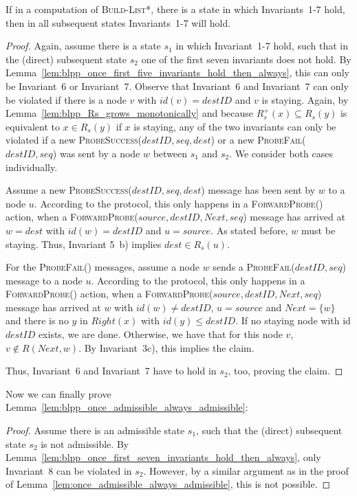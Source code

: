\documentclass[a4paper,USenglish]{lipics}
\newcommand{\blpp}{\textsc{Build-List*}\xspace}
\newcommand{\forwardprobe}[1]{\textsc{ForwardProbe(\ensuremath{#1})}\xspace}
\newcommand{\psuccess}[1]{\textsc{ProbeSuccess(\ensuremath{#1})}\xspace}
\newcommand{\pfail}[1]{\textsc{ProbeFail(\ensuremath{#1})}\xspace}
\newcommand{\rsp}{\ensuremath{R_s^+}\xspace}
\begin{document}
\begin{lemma}\label{lem:blpp_once_first_seven_invariants_hold_then_always}
 If in a computation of \blpp, there is a state in which Invariants~1-7 hold, then in all subsequent states Invariants~1-7 will hold.
\end{lemma}
\begin{proof}
  Again, assume there is a state $s_1$ in which Invariant~1-7 hold, such that in the (direct) subsequent state $s_2$ one of the first seven invariants does not hold.
 By Lemma~\ref{lem:blpp_once_first_five_invariants_hold_then_always}, this can only be Invariant~6 or Invariant~7.
 Observe that Invariant~6 and Invariant~7 can only be violated if there is a node $v$ with $id(v) = destID$ and $v$ is staying.
 Again, by Lemma~\ref{lem:blpp_Rs_grows_monotonically} and because $\rsp(x) \subseteq R_s(y)$ is equivalent to $x \in R_s(y)$ if $x$ is staying, any of the two invariants can only be violated if a new \psuccess{destID,seq,dest} or a new \pfail{destID,seq} was sent by a node $w$ between $s_1$ and $s_2$.
 We consider both cases individually.
 
 Assume a new \psuccess{destID,seq,dest} message has been sent by $w$ to a node $u$.
 	According to the protocol, this only happens in a \forwardprobe{} action, when a \forwardprobe{source,destID,Next,seq} message has arrived at $w = dest$ with $id(w) = destID$ and $u = source$.
 	As stated before, $w$ must be staying.
	Thus, Invariant 5~b) implies $dest \in R_s(u)$.
	
	For the \pfail{} messages, assume a node $w$ sends a \pfail{destID, seq} message to a node $u$.
	According to the protocol, this only happens in a \forwardprobe{} action, when a \forwardprobe{source,destID,Next,seq} message has arrived at $w$ with $id(w) \neq destID$, $u = source$ and $Next = \{w\}$ and there is no $y$ in $Right(x)$ with $id(y) \leq destID$.
	If no staying node with id $destID$ exists, we are done.
	Otherwise, we have that for this node $v$, $v \notin R(Next,w)$.
	By Invariant~3c), this implies the claim.

 Thus, Invariant~6 and Invariant~7 have to hold in $s_2$, too, proving the claim.
\end{proof}
Now we can finally prove Lemma~\ref{lem:blpp_once_admissible_always_admissible}:
\begin{proof}
 Assume there is an admissible state $s_1$, such that the (direct) subsequent state $s_2$ is not admissible.
 By Lemma~\ref{lem:blpp_once_first_seven_invariants_hold_then_always}, only Invariant~8 can be violated in $s_2$.
 However, by a similar argument as in the proof of Lemma~\ref{lem:once_admissible_always_admissible}, this is not possible.
\end{proof}
\end{document}
